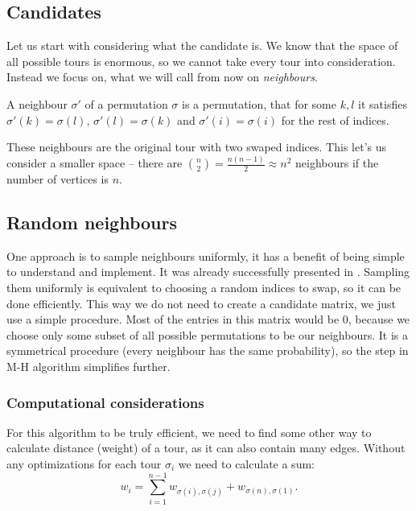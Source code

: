 \subsection{Candidates}
	Let us start with considering what the candidate is. We know that the space of all possible tours is enormous, so we cannot take every tour into consideration. Instead we focus on, what we will call from now on \textit{neighbours}.
	\begin{definition}
		A neighbour $\sigma'$ of a permutation $\sigma$ is a permutation, that for some $k, l$ it satisfies $\sigma'(k) = \sigma(l)$, $\sigma'(l) = \sigma(k)$ and $\sigma'(i) = \sigma(i)$ for the rest of indices.
	\end{definition}
	These neighbours are the original tour with two swaped indices. This let's us consider a smaller space -- there are $\binom{n}{2} = \frac{n(n-1)}{2} \approx n^2$ neighbours if the number of vertices is $n$.

\subsection{Random neighbours}
	One approach is to sample neighbours uniformly, it has a benefit of being simple to understand and implement. It was already successfully presented in \cite{decryption_tsp_MCMC}. Sampling them uniformly is equivalent to choosing a random indices to swap, so it can be done efficiently. This way we do not need to create a candidate matrix, we just use a simple procedure. Most of the entries in this matrix would be $0$, because we choose only some subset of all possible permutations to be our neighbours. It is a symmetrical procedure (every neighbour has the same probability), so the step in M-H algorithm simplifies further.
	
	\subsubsection{Computational considerations}
		For this algorithm to be truly efficient, we need to find some other way to calculate distance (weight) of a tour, as it can also contain many edges. Without any optimizations for each tour $\sigma_i$ we need to calculate a sum:
		\begin{equation*}
			w_i = \sum_{i=1}^{n-1} w_{\sigma(i), \sigma(j)} + w_{\sigma(n), \sigma(1)}.
		\end{equation*}
		
